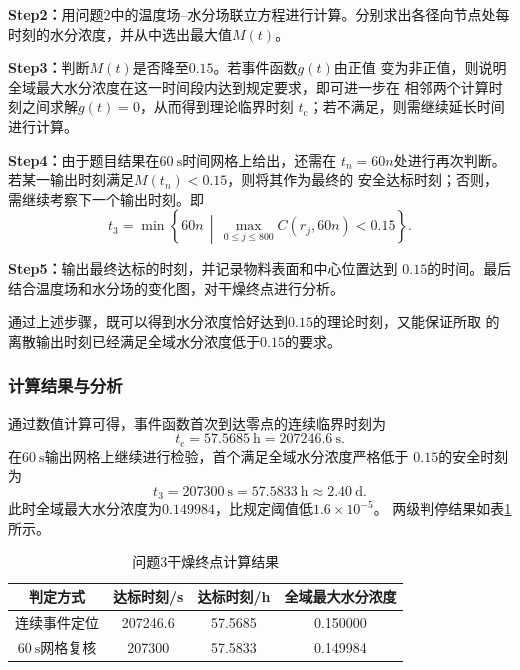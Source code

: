 \documentclass[UTF8,a4paper,12pt]{ctexart}
\providecommand{\QThreeDryHours}{57.5833}
\begin{document}
\noindent\textbf{Step2：}用问题2中的温度场--水分场联立方程进行计算。分别求出各径向节点处每时刻的水分浓度，并从中选出最大值$M(t)$。

\noindent\textbf{Step3：}判断$M(t)$是否降至$0.15$。若事件函数$g(t)$由正值
变为非正值，则说明全域最大水分浓度在这一时间段内达到规定要求，即可进一步在
相邻两个计算时刻之间求解$g(t)=0$，从而得到理论临界时刻
$t_{\mathrm{c}}$；若不满足，则需继续延长时间进行计算。

\noindent\textbf{Step4：}由于题目结果在$60\ \mathrm{s}$时间网格上给出，还需在
$t_n=60n$处进行再次判断。若某一输出时刻满足$M(t_n)<0.15$，则将其作为最终的
安全达标时刻；否则，需继续考察下一个输出时刻。即
\begin{equation}
t_3=\min\left\{60n\,\middle|\,
\max_{0\leq j\leq800}C(r_j,60n)<0.15\right\}.
\label{eq:q3_safe_time}
\end{equation}

\noindent\textbf{Step5：}输出最终达标的时刻，并记录物料表面和中心位置达到
$0.15$的时间。最后结合温度场和水分场的变化图，对干燥终点进行分析。

通过上述步骤，既可以得到水分浓度恰好达到$0.15$的理论时刻，又能保证所取
的离散输出时刻已经满足全域水分浓度低于$0.15$的要求。

\subsubsection{计算结果与分析}

通过数值计算可得，事件函数首次到达零点的连续临界时刻为
\begin{equation}
t_{\mathrm{c}}=57.5685\ \mathrm{h}
=207246.6\ \mathrm{s}.
\label{eq:q3_critical_result}
\end{equation}
在$60\ \mathrm{s}$输出网格上继续进行检验，首个满足全域水分浓度严格低于
$0.15$的安全时刻为
\begin{equation}
\boxed{t_3=207300\ \mathrm{s}
=\QThreeDryHours\ \mathrm{h}
\approx2.40\ \mathrm{d}}.
\label{eq:q3_final_result}
\end{equation}
此时全域最大水分浓度为$0.149984$，比规定阈值低$1.6\times10^{-5}$。
两级判停结果如表\ref{tab:q3_results}所示。

\begin{table}[H]
\centering
\caption{问题3干燥终点计算结果}
\label{tab:q3_results}
\begin{tabular}{cccc}
\toprule
判定方式 & 达标时刻/s & 达标时刻/h & 全域最大水分浓度 \\
\midrule
连续事件定位 & 207246.6 & 57.5685 & 0.150000 \\
$60\ \mathrm{s}$网格复核 & 207300 & 57.5833 & 0.149984 \\
\bottomrule
\end{tabular}
\end{table}
\end{document}
